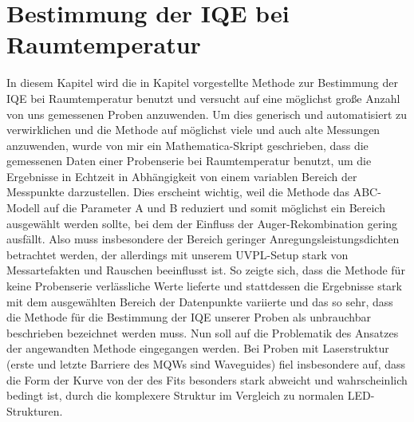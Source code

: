 \section{Bestimmung der IQE bei Raumtemperatur}
\thispagestyle{fancy}

In diesem Kapitel wird die in Kapitel vorgestellte Methode zur Bestimmung der IQE bei Raumtemperatur benutzt und versucht auf eine möglichst große Anzahl von uns gemessenen Proben anzuwenden. 
Um dies generisch und automatisiert zu verwirklichen und die Methode auf möglichst viele und auch alte Messungen anzuwenden, wurde von mir ein Mathematica-Skript geschrieben, dass die gemessenen Daten einer Probenserie bei Raumtemperatur benutzt, um die Ergebnisse in Echtzeit in Abhängigkeit von einem variablen Bereich der Messpunkte darzustellen. Dies erscheint wichtig, weil die Methode das ABC-Modell auf die Parameter A und B reduziert und somit möglichst ein Bereich ausgewählt werden sollte, bei dem der Einfluss der Auger-Rekombination gering ausfällt.
Also muss insbesondere der Bereich geringer Anregungsleistungsdichten betrachtet werden, der allerdings mit unserem UVPL-Setup stark von Messartefakten und Rauschen beeinflusst ist. So zeigte sich, dass die Methode für keine Probenserie verlässliche Werte lieferte und stattdessen die Ergebnisse stark mit dem ausgewählten Bereich der Datenpunkte variierte und das so sehr, dass die Methode für die Bestimmung der IQE unserer Proben als unbrauchbar beschrieben bezeichnet werden muss.
Nun soll auf die Problematik des Ansatzes der angewandten Methode eingegangen werden. Bei Proben mit Laserstruktur (erste und letzte Barriere des MQWs sind Waveguides) fiel insbesondere auf, dass die Form der Kurve von der des Fits besonders stark abweicht und wahrscheinlich bedingt ist, durch die komplexere Struktur im Vergleich zu normalen LED-Strukturen. 